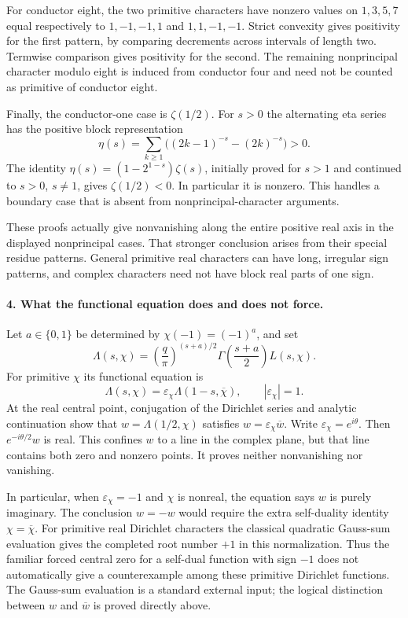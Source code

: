 \documentclass[11pt]{article}
\begin{document}
For conductor eight, the two primitive characters have nonzero values on $1,3,5,7$ equal respectively to $1,-1,-1,1$ and $1,1,-1,-1$. Strict convexity gives positivity for the first pattern, by comparing decrements across intervals of length two. Termwise comparison gives positivity for the second. The remaining nonprincipal character modulo eight is induced from conductor four and need not be counted as primitive of conductor eight.

Finally, the conductor-one case is $\zeta(1/2)$. For $s>0$ the alternating eta series has the positive block representation
\[
 \eta(s)=\sum_{k\geq1}\bigl((2k-1)^{-s}-(2k)^{-s}\bigr)>0.
\]
The identity $\eta(s)=(1-2^{1-s})\zeta(s)$, initially proved for $s>1$ and continued to $s>0$, $s\ne1$, gives $\zeta(1/2)<0$. In particular it is nonzero. This handles a boundary case that is absent from nonprincipal-character arguments.

These proofs actually give nonvanishing along the entire positive real axis in the displayed nonprincipal cases. That stronger conclusion arises from their special residue patterns. General primitive real characters can have long, irregular sign patterns, and complex characters need not have block real parts of one sign.

\paragraph{4. What the functional equation does and does not force.}
Let $a\in\{0,1\}$ be determined by $\chi(-1)=(-1)^a$, and set
\[
 \Lambda(s,\chi)=\left(\frac q\pi\right)^{(s+a)/2}
 \Gamma\left(\frac{s+a}{2}\right)L(s,\chi).
\]
For primitive $\chi$ its functional equation is
\[
 \Lambda(s,\chi)=\varepsilon_\chi\Lambda(1-s,\overline\chi),
 \qquad |\varepsilon_\chi|=1.
\]
At the real central point, conjugation of the Dirichlet series and analytic continuation show that $w=\Lambda(1/2,\chi)$ satisfies $w=\varepsilon_\chi\overline w$. Write $\varepsilon_\chi=e^{i\theta}$. Then $e^{-i\theta/2}w$ is real. This confines $w$ to a line in the complex plane, but that line contains both zero and nonzero points. It proves neither nonvanishing nor vanishing.

In particular, when $\varepsilon_\chi=-1$ and $\chi$ is nonreal, the equation says $w$ is purely imaginary. The conclusion $w=-w$ would require the extra self-duality identity $\chi=\overline\chi$. For primitive real Dirichlet characters the classical quadratic Gauss-sum evaluation gives the completed root number $+1$ in this normalization. Thus the familiar forced central zero for a self-dual function with sign $-1$ does not automatically give a counterexample among these primitive Dirichlet functions. The Gauss-sum evaluation is a standard external input; the logical distinction between $w$ and $\overline w$ is proved directly above.
\end{document}
